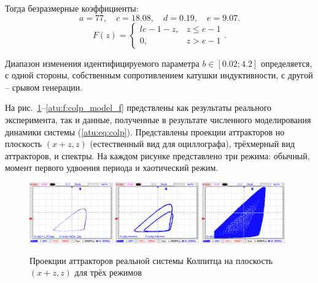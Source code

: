 Тогда безразмерные коэффициенты:
\[
 a = 77,     \quad
 c = 18.08,  \quad
 d = 0.19,   \quad
 e = 9.07.
\]
%
\[
F(z) =
\begin{cases}{l}
  e-1-z, & z \le e-1  \\
  0,     & z  >  e-1
\end{cases}.
\]


Диапазон изменения идентифицируемого параметра
$b \in [ 0.02; 4.2 ]$
определяется, с одной стороны, собственным сопротивлением катушки индуктивности,
с другой -- срывом генерации.


На рис.~\ref{atu:f:colp_real_xzz}--\ref{atu:f:colp_model_f} предствлены как результаты реального эксперимента,
так и данные, полученные в результате численного моделирования динамики системы (\ref{atu:eq:colp}).
Представлены проекции аттракторов но плоскость $(x+z,z)$ (естественный вид для оциллографа),
трёхмерный вид аттракторов, и спектры.
На каждом рисунке представлено три режима: обычный, момент первого удвоения периода и хаотический режим.


\begin{figure}[htb!]
 \centerline{
   \includegraphics[width=0.32\textwidth]{p/cha/colp/colp_m1_vv.png}
   \includegraphics[width=0.32\textwidth]{p/cha/colp/colp_m2_vv.png}
   \includegraphics[width=0.32\textwidth]{p/cha/colp/colp_m3_vv_ac.png}
 }
  \caption{Проекции аттракторов реальной системы Колпитца на плоскость $(x+z,z)$
  для трёх режимов}
  \label{atu:f:colp_real_xzz}
\end{figure}

